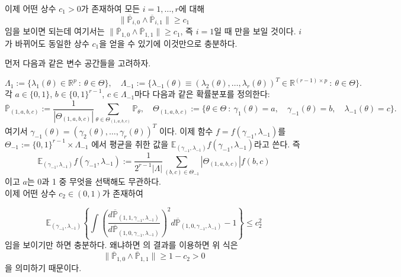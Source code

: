 
이제 어떤 상수 $c_1>0$가 존재하여 모든 $i=1, \dots, r$에 대해
\[
\|\overline{\mathbb{P}}_{i,0}\wedge \overline{\mathbb{P}}_{i,1}\| \ge c_1
\]
임을 보이면 되는데 여기서는 $\|\overline{\mathbb{P}}_{1,0}\wedge \overline{\mathbb{P}}_{1,1}\| \ge c_1$, 즉 $i=1$일 때 만을 보일 것이다. $i$가 바뀌어도 동일한 상수 $c_1$을 얻을 수 있기에 이것만으로 충분하다. \newline

먼저 다음과 같은 변수 공간들을 고려하자.

\[
\Lambda_1 := \{ \lambda_1 (\theta) \in \mathbb{R}^p \ : \ \theta\in\Theta\}, \quad \Lambda_{-1}:= \{ \lambda_{-1}(\theta) \equiv (\lambda_2(\theta), \dots, \lambda_r(\theta))^T \in \mathbb{R}^{(r-1)\times p} \ : \ \theta\in\Theta\}. 
\]
각 $a \in \{0,1\}$, $b\in\{0,1\}^{r-1}$, $c\in \Lambda_{-1}$마다 다음과 같은 확률분포를 정의한다:
\[
\overline{\mathbb{P}}_{(1,a,b,c)} := \frac{1}{|\Theta_{(1,a,b,c)}|} \sum_{\theta \in \Theta_{(1,a,b,c)}} \mathbb{P}_\theta, \quad \Theta_{(1,a,b,c)} :=  \{\theta\in\Theta \ : \ \gamma_1(\theta) = a, \quad \gamma_{-1}(\theta) = b, \quad \lambda_{-1}(\theta) = c\}.
\]
여기서 $\gamma_{-1}(\theta) = (\gamma_2(\theta), \dots, \gamma_r(\theta))^T$ 이다. 이제 함수 $f= f(\gamma_{-1}, \lambda_{-1})$를 $\Theta_{-1}:= \{0,1\}^{r-1}\times\Lambda_{-1}$ 에서 평균을 취한 값을 $\mathbb{E}_{(\gamma_{-1}, \lambda_{-1})}f(\gamma_{-1}, \lambda_{-1})$라고 쓴다. 즉
\[
\mathbb{E}_{(\gamma_{-1}, \lambda_{-1})}f(\gamma_{-1}, \lambda_{-1}) := \frac{1}{2^{r-1}|\Lambda|} \sum_{(b,c)\in \Theta_{-1}} |\Theta_{(1,a,b,c)}| f(b,c)
\]
이고 $a$는 0과 1 중 무엇을 선택해도 무관하다.\\

이제 어떤 상수 $c_2\in(0,1)$가 존재하여

\begin{equation}\label{16}\tag{16}
\mathbb{E}_{(\gamma_{-1}, \lambda_{-1})}\left\{ \int \left(\frac{d\overline{\mathbb{P}}_{(1,1,\gamma_{-1}, \lambda_{-1})} }{d\overline{\mathbb{P}}_{(1,0,\gamma_{-1}, \lambda_{-1})} } \right)^2 d\overline{\mathbb{P}}_{(1,0,\gamma_{-1}, \lambda_{-1})} -1 \right\} \le c_2^2
\end{equation}
임을 보이기만 하면 충분하다. 왜냐하면 \cite[Lemma 8, (ii)]{cai2012optimal}의 결과를 이용하면 위 식은
\[
\| \overline{\mathbb{P}}_{1,0}\wedge \overline{\mathbb{P}}_{1,1} \| \ge 1-c_2 >0
\]
을 의미하기 때문이다. \\

